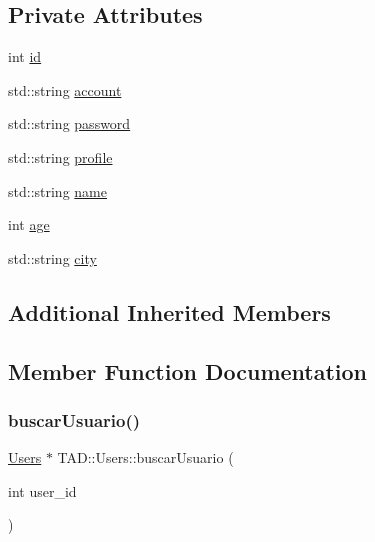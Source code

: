 \subsection*{Private Attributes}
\begin{DoxyCompactItemize}
\item 
int \hyperlink{class_t_a_d_1_1_users_a8b8c32b02b9bd942d844d738d94ff21b}{id}
\item 
std\+::string \hyperlink{class_t_a_d_1_1_users_a013ff5d23b0a55d1ff6592c249a541d1}{account}
\item 
std\+::string \hyperlink{class_t_a_d_1_1_users_a79868d049deeaf4a13005edd3c25cbc3}{password}
\item 
std\+::string \hyperlink{class_t_a_d_1_1_users_a5f4326a94e606d2e6aa6d60ecf0d5e68}{profile}
\item 
std\+::string \hyperlink{class_t_a_d_1_1_users_af3d17249c461b12bbc71491da7b4cb94}{name}
\item 
int \hyperlink{class_t_a_d_1_1_users_a0801b7b5b5bb7125b839bec33b86b72f}{age}
\item 
std\+::string \hyperlink{class_t_a_d_1_1_users_acc9188d8a53143889d39986dd4e65997}{city}
\end{DoxyCompactItemize}
\subsection*{Additional Inherited Members}


\subsection{Member Function Documentation}
\mbox{\label{class_t_a_d_1_1_users_a3b681998b5ce1ed820dae5fbede28c99}} 
\subsubsection{\texorpdfstring{buscar\+Usuario()}{buscarUsuario()}}
{\footnotesize\ttfamily \hyperlink{class_t_a_d_1_1_users}{Users} $\ast$ T\+A\+D\+::\+Users\+::buscar\+Usuario (\begin{DoxyParamCaption}\item[{int}]{user\+\_\+id }\end{DoxyParamCaption})}



